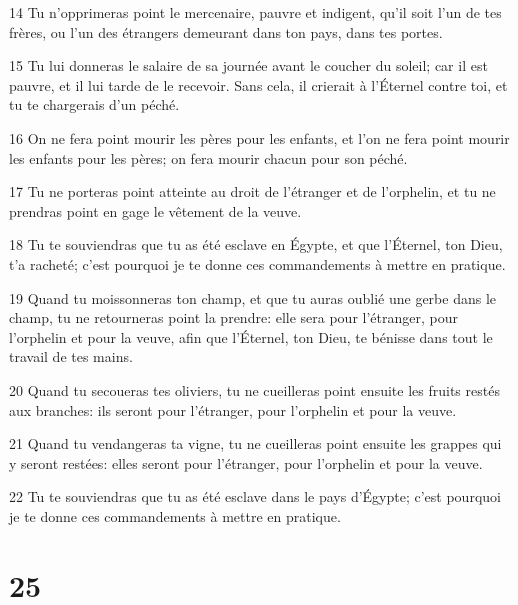 \par 14 Tu n'opprimeras point le mercenaire, pauvre et indigent, qu'il soit l'un de tes frères, ou l'un des étrangers demeurant dans ton pays, dans tes portes.
\par 15 Tu lui donneras le salaire de sa journée avant le coucher du soleil; car il est pauvre, et il lui tarde de le recevoir. Sans cela, il crierait à l'Éternel contre toi, et tu te chargerais d'un péché.
\par 16 On ne fera point mourir les pères pour les enfants, et l'on ne fera point mourir les enfants pour les pères; on fera mourir chacun pour son péché.
\par 17 Tu ne porteras point atteinte au droit de l'étranger et de l'orphelin, et tu ne prendras point en gage le vêtement de la veuve.
\par 18 Tu te souviendras que tu as été esclave en Égypte, et que l'Éternel, ton Dieu, t'a racheté; c'est pourquoi je te donne ces commandements à mettre en pratique.
\par 19 Quand tu moissonneras ton champ, et que tu auras oublié une gerbe dans le champ, tu ne retourneras point la prendre: elle sera pour l'étranger, pour l'orphelin et pour la veuve, afin que l'Éternel, ton Dieu, te bénisse dans tout le travail de tes mains.
\par 20 Quand tu secoueras tes oliviers, tu ne cueilleras point ensuite les fruits restés aux branches: ils seront pour l'étranger, pour l'orphelin et pour la veuve.
\par 21 Quand tu vendangeras ta vigne, tu ne cueilleras point ensuite les grappes qui y seront restées: elles seront pour l'étranger, pour l'orphelin et pour la veuve.
\par 22 Tu te souviendras que tu as été esclave dans le pays d'Égypte; c'est pourquoi je te donne ces commandements à mettre en pratique.

\chapter{25}

